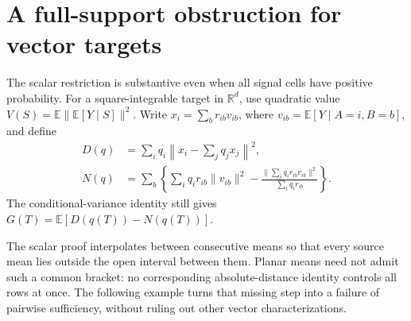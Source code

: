 \documentclass[11pt,a4paper]{article}
\begin{document}
\section{A full-support obstruction for vector targets}\label{sec:vector}
The scalar restriction is substantive even when all signal cells have positive
probability. For a square-integrable target in $\mathbb R^d$, use quadratic value
$V(S)=\mathbb E\|\mathbb E[Y\mid S]\|^2$. Write
$x_i=\sum_b r_{ib}v_{ib}$, where $v_{ib}=\mathbb E[Y\mid A=i,B=b]$, and define
\begin{align*}
 D(q)&=\sum_iq_i\left\|x_i-\sum_jq_jx_j\right\|^2,\\
 N(q)&=\sum_b\left\{\sum_iq_ir_{ib}\|v_{ib}\|^2-
 \frac{\|\sum_iq_ir_{ib}v_{ib}\|^2}{\sum_iq_ir_{ib}}\right\}.
\end{align*}
The conditional-variance identity still gives
$G(T)=\mathbb E[D(q(T))-N(q(T))]$.

The scalar proof interpolates between consecutive means so that every source mean lies outside the open interval between them. Planar means need not admit such a common bracket: no corresponding absolute-distance identity controls all rows at once. The following example turns that missing step into a failure of pairwise sufficiency, without ruling out other vector characterizations.
\end{document}
